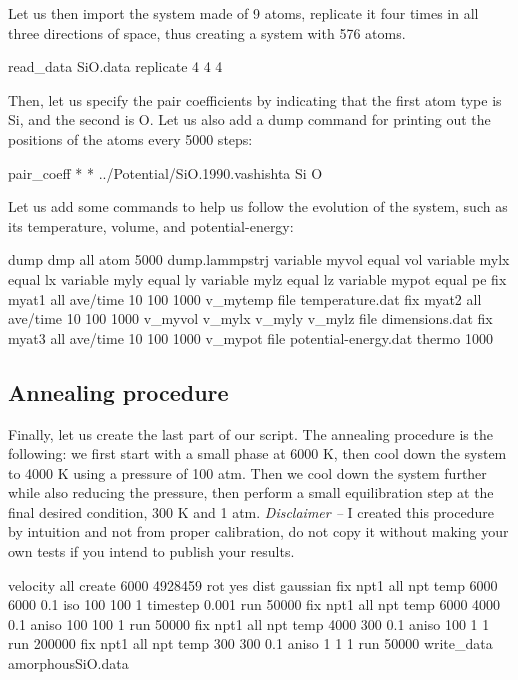 \noindent Let us then import the system made of 9 atoms, replicate it four times in all three
directions of space, thus creating a system with 576 atoms.

\begin{lcverbatim}
read_data SiO.data
replicate 4 4 4
\end{lcverbatim}

\noindent Then, let us specify the pair coefficients by indicating
that the first atom type is Si, and the second is O. Let us also
add a dump command for printing out the positions of the
atoms every 5000 steps:

\begin{lcverbatim}
pair_coeff * * ../Potential/SiO.1990.vashishta Si O
\end{lcverbatim}

\noindent Let us add some commands to help us follow the evolution of the system,
such as its temperature, volume, and potential-energy:

\begin{lcverbatim}
dump dmp all atom 5000 dump.lammpstrj
variable myvol equal vol
variable mylx equal lx
variable myly equal ly
variable mylz equal lz
variable mypot equal pe
fix myat1 all ave/time 10 100 1000 v_mytemp file temperature.dat
fix myat2 all ave/time 10 100 1000 v_myvol v_mylx v_myly v_mylz file dimensions.dat
fix myat3 all ave/time 10 100 1000 v_mypot file potential-energy.dat
thermo 1000
\end{lcverbatim}

\noindent \subsection{Annealing procedure}

Finally, let us create the last part of our script. The
annealing procedure is the following: we first start with a
small phase at 6000 K, then cool down the system to 4000 K
using a pressure of 100 atm. Then we cool down the system
further while also reducing the pressure, then perform a
small equilibration step at the final desired condition, 300
K and 1 atm.
\textit{Disclaimer --} I created this procedure by intuition and
not from proper calibration, do not copy it without
making your own tests if you intend to publish your
results.

\begin{lcverbatim}
velocity all create 6000 4928459 rot yes dist gaussian
fix npt1 all npt temp 6000 6000 0.1 iso 100 100 1
timestep 0.001
run 50000
fix npt1 all npt temp 6000 4000 0.1 aniso 100 100 1
run 50000
fix npt1 all npt temp 4000 300 0.1 aniso 100 1 1
run 200000
fix npt1 all npt temp 300 300 0.1 aniso 1 1 1
run 50000
write_data amorphousSiO.data
\end{lcverbatim}

